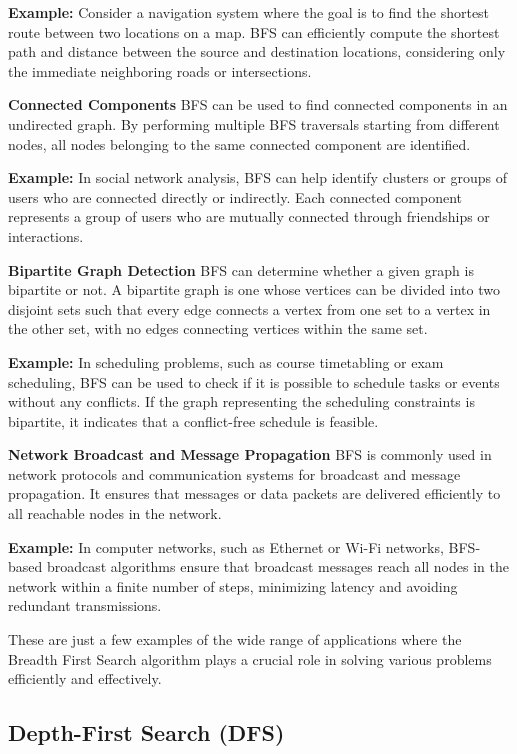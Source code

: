 \documentclass[12pt]{book} %
\begin{document}
\textbf{Example:} Consider a navigation system where the goal is to find the shortest route between two locations on a map. BFS can efficiently compute the shortest path and distance between the source and destination locations, considering only the immediate neighboring roads or intersections.

\textbf{Connected Components}
BFS can be used to find connected components in an undirected graph. By performing multiple BFS traversals starting from different nodes, all nodes belonging to the same connected component are identified.

\textbf{Example:} In social network analysis, BFS can help identify clusters or groups of users who are connected directly or indirectly. Each connected component represents a group of users who are mutually connected through friendships or interactions.

\textbf{Bipartite Graph Detection}
BFS can determine whether a given graph is bipartite or not. A bipartite graph is one whose vertices can be divided into two disjoint sets such that every edge connects a vertex from one set to a vertex in the other set, with no edges connecting vertices within the same set.

\textbf{Example:} In scheduling problems, such as course timetabling or exam scheduling, BFS can be used to check if it is possible to schedule tasks or events without any conflicts. If the graph representing the scheduling constraints is bipartite, it indicates that a conflict-free schedule is feasible.

\textbf{Network Broadcast and Message Propagation}
BFS is commonly used in network protocols and communication systems for broadcast and message propagation. It ensures that messages or data packets are delivered efficiently to all reachable nodes in the network.

\textbf{Example:} In computer networks, such as Ethernet or Wi-Fi networks, BFS-based broadcast algorithms ensure that broadcast messages reach all nodes in the network within a finite number of steps, minimizing latency and avoiding redundant transmissions.

These are just a few examples of the wide range of applications where the Breadth First Search algorithm plays a crucial role in solving various problems efficiently and effectively.

\subsection{Depth-First Search (DFS)}
\end{document}
